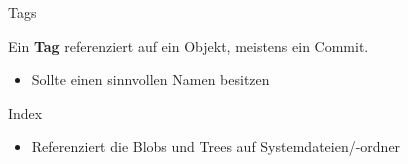 \begin{frame}{Tags}
  \begin{Definition}
    Ein \textbf{Tag} referenziert auf ein Objekt, meistens ein Commit.
  \end{Definition}
  \begin{itemize}
    \pause
    \item Sollte einen sinnvollen Namen besitzen
  \end{itemize}
\end{frame}

\begin{frame}{Index}
  \begin{itemize}
    \item Referenziert die Blobs und Trees auf Systemdateien/-ordner
  \end{itemize}
\end{frame}
